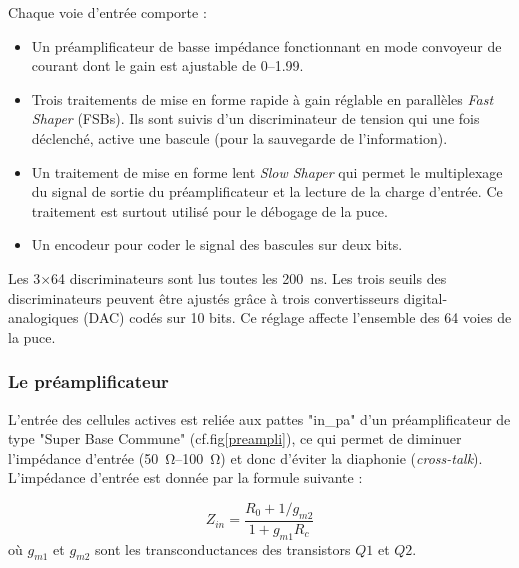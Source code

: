 Chaque voie d'entrée comporte :
\begin{itemize}[label=$\bullet$]
	\item Un préamplificateur de basse impédance fonctionnant en mode convoyeur de courant dont le gain est ajustable de \SIrange{0}{1.99}{}.
	\item Trois traitements de mise en forme rapide à gain réglable en parallèles \textit{Fast Shaper} (FSBs). Ils sont suivis d'un discriminateur de tension qui une fois déclenché, active une bascule (pour la sauvegarde de l'information).
	\item Un traitement de mise en forme lent \textit{Slow Shaper} qui permet le multiplexage du signal de sortie du préamplificateur et la lecture de la charge d'entrée. Ce traitement est surtout utilisé pour le débogage de la puce.
	\item Un encodeur pour coder le signal des bascules sur deux bits.
\end{itemize}

Les \num{3}$\times$\num{64} discriminateurs sont lus toutes les \SI{200}{\nano\second}. Les trois seuils des discriminateurs peuvent être ajustés grâce à trois convertisseurs digital-analogiques (DAC) codés sur \num{10} bits. Ce réglage affecte l'ensemble des \num{64} voies de la puce.

\subsubsection{Le préamplificateur}
L'entrée des cellules actives est reliée aux pattes "in\_pa" d'un préamplificateur de type "Super Base Commune" (cf.fig\ref{preampli}), ce qui permet de diminuer l'impédance d'entrée (\SIrange{50}{100}{\ohm}) et donc d'éviter la diaphonie (\textit{cross-talk}). L'impédance d'entrée est donnée par la formule suivante :

\begin{equation}
Z_{in}=\frac{R_0+1/g_{m2}}{1+g_{m1}R_c}
\end{equation}
où $g_{m1}$ et $g_{m2}$ sont les transconductances des transistors $Q1$ et $Q2$.

